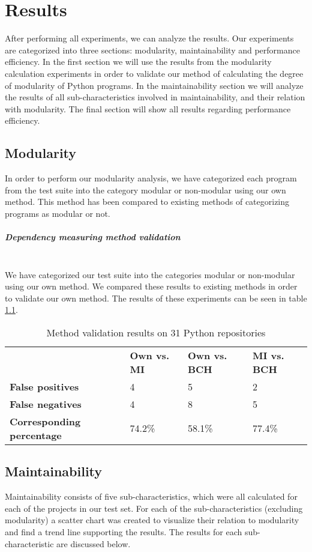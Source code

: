 \documentclass[twoside]{uva-inf-bachelor-thesis}
\newcommand{\myparagraph}[1]{\paragraph{#1}\mbox{}\\}
\begin{document}
\chapter{Results}
After performing all experiments, we can analyze the results. Our experiments are categorized into three sections: modularity, maintainability and performance efficiency. In the first section we will use the results from the modularity calculation experiments in order to validate our method of calculating the degree of modularity of Python programs. In the maintainability section we will analyze the results of all sub-characteristics involved in maintainability, and their relation with modularity. The final section will show all results regarding performance efficiency.

\section{Modularity}
In order to perform our modularity analysis, we have categorized each program from the test suite into the category modular or non-modular using our own method. This method has been compared to existing methods of categorizing programs as modular or not.

\myparagraph{Dependency measuring method validation}
We have categorized our test suite into the categories modular or non-modular using our own method. We compared these results to existing methods in order to validate our own method. The results of these experiments can be seen in table \ref{table:validation}.

\begin{table}[H]
\centering
\caption{Method validation results on 31 Python repositories}
\label{table:validation}
\begin{tabular}{llll}
\textbf{}                         & \textbf{Own vs. MI} & \textbf{Own vs. BCH} & \textbf{MI vs. BCH} \\ 
\textbf{False positives}          & 4                   & 5                    & 2                   \\
\textbf{False negatives}          & 4                   & 8                    & 5                   \\
\textbf{Corresponding percentage} & 74.2\%              & 58.1\%               & 77.4\%             
\end{tabular}
\end{table}

\section{Maintainability}
Maintainability consists of five sub-characteristics, which were all calculated for each of the projects in our test set. For each of the sub-characteristics (excluding modularity) a scatter chart was created to visualize their relation to modularity and find a trend line supporting the results. The results for each sub-characteristic are discussed below.
\end{document}
